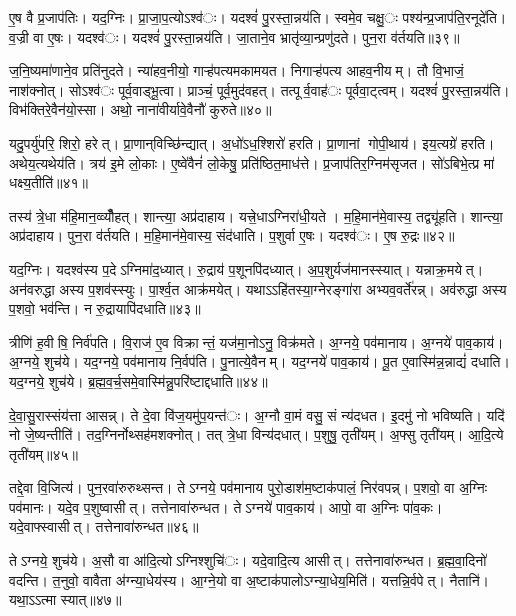 ए॒ष वै प्र॒जाप॑तिः। यद॒ग्निः। प्रा॒जा॒प॒त्योऽश्व॑ः। यदश्वं॑ पु॒रस्ता॒न्नय॑ति। स्वमे॒व चक्षु॒ः पश्य॑न्प्र॒जाप॑ति॒रनूदे॑ति। व॒ज्री वा ए॒षः। यदश्व॑ः। यदश्वं॑ पु॒रस्ता॒न्नय॑ति। जा॒ताने॒व भ्रातृ॑व्या॒न्प्रणु॑दते। पुन॒रा व॑र्तयति॥३९॥

ज॒नि॒ष्यमा॑णाने॒व प्रति॑नुदते। न्या॑हव॒नीयो॒ गाऱ्ह॑पत्यमकामयत। निगाऱ्ह॑पत्य आहव॒नीयम्। तौ वि॒भाजं॒ नाश॑क्नोत्। सोऽश्व॑ः पूर्व॒वाड्भू॒त्वा। प्राञ्चं॒ पूर्व॒मुद॑वहत्। तत्पूर्व॒वाह॑ः पूर्ववा॒ट्त्वम्। यदश्वं॑ पु॒रस्ता॒न्नय॑ति। विभ॑क्तिरे॒वैन॑यो॒स्सा। अथो॒ नाना॑वीर्यावे॒वैनौ॑ कुरुते॥४०॥

यदु॒पर्यु॑परि॒ शिरो॒ हरेत्। प्रा॒णान्‌विच्छि॑न्द्यात्। अ॒धो॑ऽध॒श्शिरो॑ हरति। प्रा॒णानां गोपी॒थाय॑। इय॒त्यग्रे॑ हरति। अथेय॒त्यथेय॑ति। त्रय॑ इ॒मे लो॒काः। ए॒ष्वे॑वैनं॑ लो॒केषु॒ प्रति॑ष्ठित॒माध॑त्ते। प्र॒जाप॑तिर॒ग्निम॑सृजत। सो॑ऽबिभे॒त्प्र मा॑ धक्ष्य॒तीति॑॥४१॥

तस्य॑ त्रे॒धा म॑हि॒मान॒व्व्यौँ॑हत्। शान्त्या॒ अप्र॑दाहाय। यत्त्रे॒धाऽग्निरा॑धी॒यते। म॒हि॒मान॑मे॒वास्य॒ तद्व्यू॑हति। शान्त्या॒ अप्र॑दाहाय। पुन॒रा व॑र्तयति। म॒हि॒मान॑मे॒वास्य॒ संद॑धाति। प॒शुर्वा ए॒षः। यदश्व॑ः। ए॒ष रु॒द्रः॥४२॥

यद॒ग्निः। यदश्व॑स्य प॒देऽग्निमा॑द॒ध्यात्। रु॒द्राय॑ प॒शूनपि॑दध्यात्। अ॒प॒शुर्यज॑मानस्स्यात्। यन्नाक्र॒मयेत्। अन॑वरुद्धा अस्य प॒शव॑स्स्युः। पा॒र्श्व॒त आक्र॑मयेत्। यथाऽऽहि॑तस्या॒ग्नेरङ्गा॑रा अभ्यव॒वर्ते॑रन्न्। अव॑रुद्धा अस्य प॒शवो॒ भव॑न्ति। न रु॒द्रायापि॑दधाति॥४३॥

त्रीणि॑ ह॒वीषि॒ निर्व॑पति। वि॒राज॑ ए॒व विक्रान्तं॒ यज॑मा॒नोऽनु॒ विक्र॑मते। अ॒ग्नये॒ पव॑मानाय। अ॒ग्नये॑ पाव॒काय॑। अ॒ग्नये॒ शुच॑ये। यद॒ग्नये॒ पव॑मानाय नि॒र्वप॑ति। पु॒नात्ये॒वैनम्। यद॒ग्नये॑ पाव॒काय॑। पू॒त ए॒वास्मि॑न्न॒न्नाद्यं॑ दधाति। यद॒ग्नये॒ शुच॑ये। ब्र॒ह्म॒व॒र्च॒समे॒वास्मि॑न्नु॒परि॑ष्टाद्दधाति॥४४॥\anuvakamend[ए॒न॒मा॒ह॒व॒नीयं॑ धत्तेऽश्व॒त्वं व॑र्तयति कुरुत॒ इति॑ रु॒द्रो द॑धाति॒ य॒दग्नये॒ शुच॑य॒ एकं॑ च]

दे॒वा॒सु॒रास्संय॑त्ता आसन्न्। ते दे॒वा वि॑ज॒यमु॑प॒यन्त॑ः। अ॒ग्नौ वा॒मं वसु॒ सं न्य॑दधत। इ॒दमु॑ नो भविष्यति। यदि॑ नो जे॒ष्यन्तीति॑। तद॒ग्निर्नोथ्सह॑मशक्नोत्। तत् त्रे॒धा विन्य॑दधात्। प॒शुषु॒ तृती॑यम्। अ॒फ्सु तृती॑यम्। आ॒दि॒त्ये तृती॑यम्॥४५॥

तद्दे॒वा वि॒जित्य॑। पुन॒रवा॑रुरुथ्सन्त। तेऽग्नये॒ पव॑मानाय पुरो॒डाश॑म॒ष्टाक॑पालं॒ निर॑वपन्न्। प॒शवो॒ वा अ॒ग्निः पव॑मानः। यदे॒व प॒शुष्वासीत्। तत्तेनावा॑रुन्धत। तेऽग्नये॑ पाव॒काय॑। आपो॒ वा अ॒ग्निः पा॑व॒कः। यदे॒वाफ्स्वासीत्। तत्तेनावा॑रुन्धत॥४६॥

तेऽग्नये॒ शुच॑ये। अ॒सौ वा आ॑दि॒त्योऽग्निश्शुचि॑ः। यदे॒वादि॒त्य आसीत्। तत्तेनावा॑रुन्धत। ब्र॒ह्म॒वा॒दिनो॑ वदन्ति। त॒नुवो॒ वावैता अ॑ग्न्या॒धेय॑स्य। आ॒ग्ने॒यो वा अ॒ष्टाक॑पालोऽग्न्या॒धेय॒मिति॑। यत्तन्नि॒र्वपेत्। नैतानि॑। यथा॒ऽऽत्मा स्यात्॥४७॥

